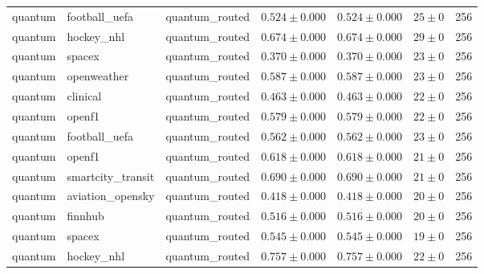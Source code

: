 \begin{table}[htbp]
\begin{tabular}{l l l r r r r}
quantum & football\_uefa & quantum\_routed & $0.524\pm0.000$ & $0.524\pm0.000$ & $25\pm0$ & 256 \\
quantum & hockey\_nhl & quantum\_routed & $0.674\pm0.000$ & $0.674\pm0.000$ & $29\pm0$ & 256 \\
quantum & spacex & quantum\_routed & $0.370\pm0.000$ & $0.370\pm0.000$ & $23\pm0$ & 256 \\
quantum & openweather & quantum\_routed & $0.587\pm0.000$ & $0.587\pm0.000$ & $23\pm0$ & 256 \\
quantum & clinical & quantum\_routed & $0.463\pm0.000$ & $0.463\pm0.000$ & $22\pm0$ & 256 \\
quantum & openf1 & quantum\_routed & $0.579\pm0.000$ & $0.579\pm0.000$ & $22\pm0$ & 256 \\
quantum & football\_uefa & quantum\_routed & $0.562\pm0.000$ & $0.562\pm0.000$ & $23\pm0$ & 256 \\
quantum & openf1 & quantum\_routed & $0.618\pm0.000$ & $0.618\pm0.000$ & $21\pm0$ & 256 \\
quantum & smartcity\_transit & quantum\_routed & $0.690\pm0.000$ & $0.690\pm0.000$ & $21\pm0$ & 256 \\
quantum & aviation\_opensky & quantum\_routed & $0.418\pm0.000$ & $0.418\pm0.000$ & $20\pm0$ & 256 \\
quantum & finnhub & quantum\_routed & $0.516\pm0.000$ & $0.516\pm0.000$ & $20\pm0$ & 256 \\
quantum & spacex & quantum\_routed & $0.545\pm0.000$ & $0.545\pm0.000$ & $19\pm0$ & 256 \\
quantum & hockey\_nhl & quantum\_routed & $0.757\pm0.000$ & $0.757\pm0.000$ & $22\pm0$ & 256 \\
\hline
\end{tabular}
\end{table}
